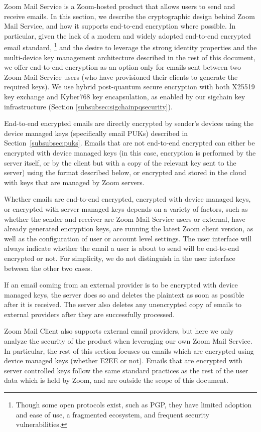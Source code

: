 \label{sec:zoommailservice}
Zoom Mail Service is a Zoom-hosted product that allows users to send and receive emails. In this
section, we describe the cryptographic design behind Zoom Mail Service, and how it supports
end-to-end encryption where possible. In particular, given the lack of a modern and widely adopted
end-to-end encrypted email standard,%
%
\footnote{Though some open protocols exist, such as PGP, they have limited adoption and ease of use,
a fragmented ecosystem, and frequent security vulnerabilities.}
%
and the desire to leverage the strong identity properties and the multi-device key management
architecture described in the rest of this document, we offer end-to-end encryption as an option
only for emails sent between two Zoom Mail Service users (who have provisioned their clients to
generate the required keys). We use hybrid post-quantum secure encryption with both X25519 key
exchange and Kyber768 key encapsulation, as enabled by our sigchain key infrastructure (Section
\ref{subsubsec:sigchainpqsecurity}).

End-to-end encrypted emails are directly encrypted by sender's devices using the device managed keys
(specifically email PUKs) described in Section~\ref{subsubsec:puks}. Emails that are not end-to-end
encrypted can either be encrypted with device managed keys (in this case, encryption is performed by
the server itself, or by the client but with a copy of the relevant key sent to the server) using
the format described below, or encrypted and stored in the cloud with keys that are managed by Zoom
servers.

Whether emails are end-to-end encrypted, encrypted with device managed keys, or encrypted with
server managed keys depends on a variety of factors, such as whether the sender and receiver are
Zoom Mail Service users or external, have already generated encryption keys, are running the latest
Zoom client version, as well as the configuration of user or account level settings. The user
interface will always indicate whether the email a user is about to send will be end-to-end
encrypted or not. For simplicity, we do not distinguish in the user interface between the other two
cases.

If an email coming from an external provider is to be encrypted with device managed keys, the server
does so and deletes the plaintext as soon as possible after it is received. The server also deletes
any unencrypted copy of emails to external providers after they are successfully processed.

Zoom Mail Client also supports external email providers, but here we only analyze the security of
the product when leveraging our own Zoom Mail Service. In particular, the rest of this section focuses on emails which are encrypted using device managed keys (whether E2EE or not). Emails that are encrypted with server controlled keys follow the same standard practices as the rest of the user data which is held by Zoom, and are outside the scope of this document.

